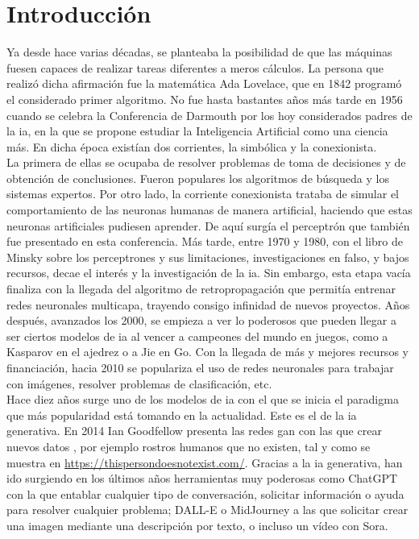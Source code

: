 \chapter*{Introducción}

	Ya desde hace varias décadas, se planteaba la posibilidad de que las máquinas fuesen capaces de realizar tareas diferentes a meros cálculos. La persona que realizó dicha afirmación fue la matemática Ada Lovelace, que en 1842 programó el considerado primer algoritmo. No fue hasta bastantes años más tarde en 1956 cuando se celebra la Conferencia de Darmouth por los hoy considerados padres de la \gls{ia}, en la que se propone estudiar la Inteligencia Artificial como una ciencia más. En dicha época existían dos corrientes, la simbólica y la conexionista.\\
	
	La primera de ellas se ocupaba de resolver problemas de toma de decisiones y de obtención de conclusiones. Fueron populares los algoritmos de búsqueda y los sistemas expertos. Por otro lado, la corriente conexionista trataba de simular el comportamiento de las neuronas humanas de manera artificial, haciendo que estas neuronas artificiales pudiesen aprender. De aquí surgía el perceptrón que también fue presentado en esta conferencia. Más tarde, entre 1970 y 1980, con el libro de Minsky sobre los perceptrones y sus limitaciones, investigaciones en falso, y bajos recursos, decae el interés y la investigación de la \gls{ia}. Sin embargo, esta etapa vacía finaliza con la llegada del algoritmo de retropropagación que permitía entrenar redes neuronales multicapa, trayendo consigo infinidad de nuevos proyectos. Años después, avanzados los 2000, se empieza a ver lo poderosos que pueden llegar a ser ciertos modelos de \gls{ia} al vencer a campeones del mundo en juegos, como a Kasparov en el ajedrez o a Jie en Go. Con la llegada de más y mejores recursos y financiación, hacia 2010 se populariza el uso de redes neuronales para trabajar con imágenes, resolver problemas de clasificación, etc. \\
	
	Hace diez años surge uno de los modelos de \gls{ia} con el que se inicia el paradigma que más popularidad está tomando en la actualidad. Este es el de la \gls{ia} generativa. En 2014 Ian Goodfellow presenta las redes \gls{gan} con las que crear nuevos datos \cite{historiaIA}, por ejemplo rostros humanos que no existen, tal y como se muestra en \url{https://thispersondoesnotexist.com/}. Gracias a la \gls{ia} generativa, han ido surgiendo en los últimos años herramientas muy poderosas como ChatGPT con la que entablar cualquier tipo de conversación, solicitar información o ayuda para resolver cualquier problema; DALL-E o MidJourney a las que solicitar crear una imagen mediante una descripción por texto, o incluso un vídeo con Sora. \\
	
